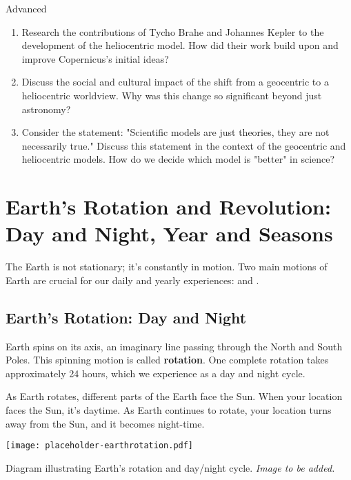 \begin{tieredquestions}{Advanced}
\begin{enumerate}
    \item Research the contributions of Tycho Brahe and Johannes Kepler to the development of the heliocentric model. How did their work build upon and improve Copernicus's initial ideas?
    \item Discuss the social and cultural impact of the shift from a geocentric to a heliocentric worldview. Why was this change so significant beyond just astronomy?
    \item  Consider the statement: "Scientific models are just theories, they are not necessarily true."  Discuss this statement in the context of the geocentric and heliocentric models. How do we decide which model is "better" in science?
\end{enumerate}
\end{tieredquestions}


\section{Earth's Rotation and Revolution: Day and Night, Year and Seasons}

The Earth is not stationary; it's constantly in motion.  Two main motions of Earth are crucial for our daily and yearly experiences:  and .

\subsection{Earth's Rotation: Day and Night}

Earth spins on its axis, an imaginary line passing through the North and South Poles. This spinning motion is called \textbf{rotation}. One complete rotation takes approximately 24 hours, which we experience as a day and night cycle.

As Earth rotates, different parts of the Earth face the Sun. When your location faces the Sun, it's daytime. As Earth continues to rotate, your location turns away from the Sun, and it becomes night-time.

\begin{marginfigure}
\texttt{[image: placeholder-earthrotation.pdf]}
\caption{\label{fig:earthrotation}Diagram illustrating Earth's rotation and day/night cycle. \textit{Image to be added.}}
\end{marginfigure}

